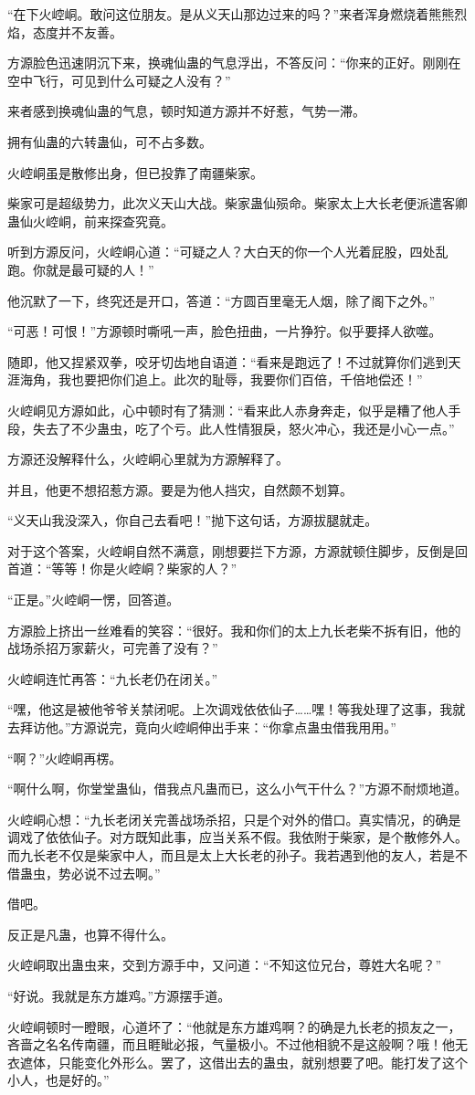 \begin{this_body}
“在下火崆峒。敢问这位朋友。是从义天山那边过来的吗？”来者浑身燃烧着熊熊烈焰，态度并不友善。

方源脸色迅速阴沉下来，换魂仙蛊的气息浮出，不答反问：“你来的正好。刚刚在空中飞行，可见到什么可疑之人没有？”

来者感到换魂仙蛊的气息，顿时知道方源并不好惹，气势一滞。

拥有仙蛊的六转蛊仙，可不占多数。

火崆峒虽是散修出身，但已投靠了南疆柴家。

柴家可是超级势力，此次义天山大战。柴家蛊仙殒命。柴家太上大长老便派遣客卿蛊仙火崆峒，前来探查究竟。

听到方源反问，火崆峒心道：“可疑之人？大白天的你一个人光着屁股，四处乱跑。你就是最可疑的人！”

他沉默了一下，终究还是开口，答道：“方圆百里毫无人烟，除了阁下之外。”

“可恶！可恨！”方源顿时嘶吼一声，脸色扭曲，一片狰狞。似乎要择人欲噬。

随即，他又捏紧双拳，咬牙切齿地自语道：“看来是跑远了！不过就算你们逃到天涯海角，我也要把你们追上。此次的耻辱，我要你们百倍，千倍地偿还！”

火崆峒见方源如此，心中顿时有了猜测：“看来此人赤身奔走，似乎是糟了他人手段，失去了不少蛊虫，吃了个亏。此人性情狠戾，怒火冲心，我还是小心一点。”

方源还没解释什么，火崆峒心里就为方源解释了。

并且，他更不想招惹方源。要是为他人挡灾，自然颇不划算。

“义天山我没深入，你自己去看吧！”抛下这句话，方源拔腿就走。

对于这个答案，火崆峒自然不满意，刚想要拦下方源，方源就顿住脚步，反倒是回首道：“等等！你是火崆峒？柴家的人？”

“正是。”火崆峒一愣，回答道。

方源脸上挤出一丝难看的笑容：“很好。我和你们的太上九长老柴不拆有旧，他的战场杀招万家薪火，可完善了没有？”

火崆峒连忙再答：“九长老仍在闭关。”

“嘿，他这是被他爷爷关禁闭呢。上次调戏依依仙子……嘿！等我处理了这事，我就去拜访他。”方源说完，竟向火崆峒伸出手来：“你拿点蛊虫借我用用。”

“啊？”火崆峒再楞。

“啊什么啊，你堂堂蛊仙，借我点凡蛊而已，这么小气干什么？”方源不耐烦地道。

火崆峒心想：“九长老闭关完善战场杀招，只是个对外的借口。真实情况，的确是调戏了依依仙子。对方既知此事，应当关系不假。我依附于柴家，是个散修外人。而九长老不仅是柴家中人，而且是太上大长老的孙子。我若遇到他的友人，若是不借蛊虫，势必说不过去啊。”

借吧。

反正是凡蛊，也算不得什么。

火崆峒取出蛊虫来，交到方源手中，又问道：“不知这位兄台，尊姓大名呢？”

“好说。我就是东方雄鸡。”方源摆手道。

火崆峒顿时一瞪眼，心道坏了：“他就是东方雄鸡啊？的确是九长老的损友之一，吝啬之名名传南疆，而且睚眦必报，气量极小。不过他相貌不是这般啊？哦！他无衣遮体，只能变化外形么。罢了，这借出去的蛊虫，就别想要了吧。能打发了这个小人，也是好的。”

\end{this_body}

